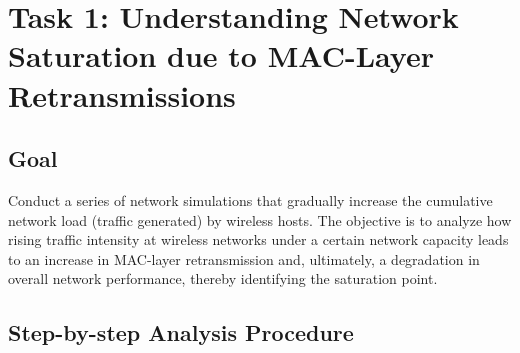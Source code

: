 \documentclass{article}
\begin{document}
\vspace{1cm}

\newpage

\tableofcontents


\section{Task 1: Understanding Network Saturation due to MAC-Layer Retransmissions}

\subsection{Goal}

Conduct a series of network simulations that gradually increase the cumulative network load (traffic generated) by wireless hosts. The objective is to analyze how rising traffic intensity at wireless networks under a certain network capacity leads to an increase in MAC-layer retransmission and, ultimately, a degradation in overall network performance, thereby identifying the saturation point.

\subsection{Step-by-step Analysis Procedure}
\end{document}

